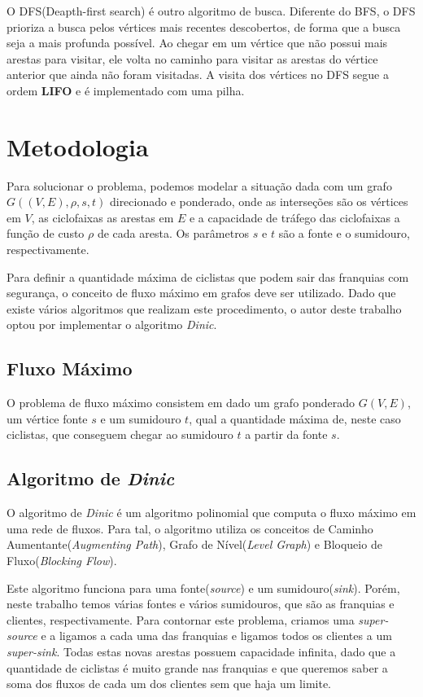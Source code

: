 \documentclass[
	12pt,
	a4paper,
	onepage,
	brazil
]{article}
\theoremstyle{definition}
\begin{document}
	O DFS(Deapth-first search) é outro algoritmo de busca. Diferente do BFS, o DFS prioriza a busca
	pelos vértices mais recentes descobertos, de forma que a busca seja a mais profunda possível. Ao chegar em um vértice que não possui mais arestas para visitar, ele volta no caminho para visitar as arestas do vértice anterior que ainda não foram visitadas. A visita dos vértices no DFS segue a ordem \textbf{LIFO} e é implementado com uma pilha.
	\section{Metodologia}
	
	Para solucionar o problema, podemos modelar a situação dada com um grafo $G((V,E), \rho, s, t)$ direcionado e ponderado, onde as interseções são os vértices em $V$, as ciclofaixas as arestas em $E$ e a capacidade de tráfego das ciclofaixas a função de custo $\rho$ de cada aresta. Os parâmetros $s$ e $t$ são a fonte e o sumidouro, respectivamente.
	
	Para definir a quantidade máxima de ciclistas que podem sair das franquias com segurança, o conceito de fluxo máximo em grafos deve ser utilizado. Dado que existe vários algoritmos que realizam este procedimento, o autor deste trabalho optou por implementar o algoritmo \textit{Dinic}.
	
	\subsection{Fluxo Máximo}
	
	O problema de fluxo máximo consistem em dado um grafo ponderado $G(V,E)$, um vértice fonte $s$ e um sumidouro $t$, qual a quantidade máxima de, neste caso ciclistas, que conseguem chegar ao sumidouro $t$ a partir da fonte $s$.
	
	\subsection{Algoritmo de \textit{Dinic}}
	
	O algoritmo de \textit{Dinic} é um algoritmo polinomial que computa o fluxo máximo em uma rede de fluxos. Para tal, o algoritmo utiliza os conceitos de Caminho Aumentante(\textit{Augmenting Path}), Grafo de Nível(\textit{Level Graph}) e Bloqueio de Fluxo(\textit{Blocking Flow}).
	
	Este algoritmo funciona para uma fonte(\textit{source}) e um sumidouro(\textit{sink}). Porém, neste trabalho temos várias fontes e vários sumidouros, que são as franquias e clientes, respectivamente. Para contornar este problema, criamos uma \textit{super-source} e a ligamos a cada uma das franquias e ligamos todos os clientes a um \textit{super-sink}. Todas estas novas arestas possuem capacidade infinita, dado que a quantidade de ciclistas é muito grande nas franquias e que queremos saber a soma dos fluxos de cada um dos clientes sem que haja um limite.
	
\end{document}
